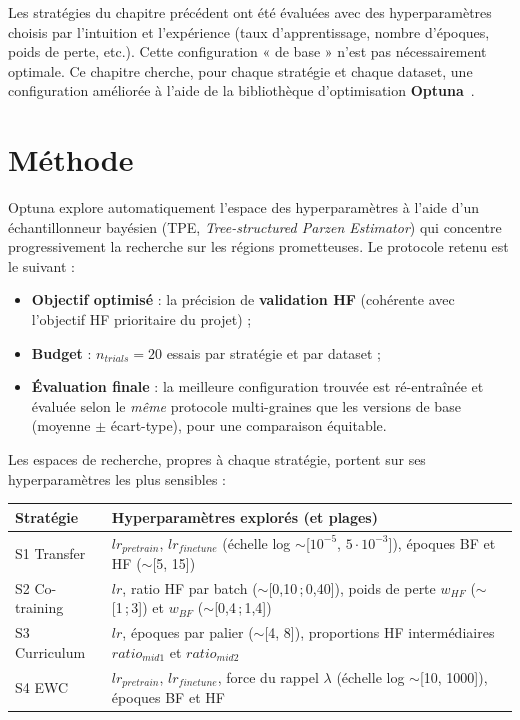 \documentclass[11pt,a4paper,openany]{book}
\newcommand{\tableheadcolor}{\rowcolor{headerbg}}
\newcommand{\tablerowodd}{}
\begin{document}
Les stratégies du chapitre précédent ont été évaluées avec des hyperparamètres choisis par l'intuition et l'expérience (taux d'apprentissage, nombre d'époques, poids de perte, etc.). Cette configuration « de base » n'est pas nécessairement optimale. Ce chapitre cherche, pour chaque stratégie et chaque dataset, une configuration améliorée à l'aide de la bibliothèque d'optimisation \textbf{Optuna}~\cite{akiba2019optuna}.

\section{Méthode}

Optuna explore automatiquement l'espace des hyperparamètres à l'aide d'un échantillonneur bayésien (TPE, \textit{Tree-structured Parzen Estimator}) qui concentre progressivement la recherche sur les régions prometteuses. Le protocole retenu est le suivant :

\begin{itemize}
  \item \textbf{Objectif optimisé} : la précision de \textbf{validation HF} (cohérente avec l'objectif HF prioritaire du projet) ;
  \item \textbf{Budget} : $n_{trials}=20$ essais par stratégie et par dataset ;
  \item \textbf{Évaluation finale} : la meilleure configuration trouvée est ré-entraînée et évaluée selon le \emph{même} protocole multi-graines que les versions de base (moyenne $\pm$ écart-type), pour une comparaison équitable.
\end{itemize}

\vspace{0.4em}
Les espaces de recherche, propres à chaque stratégie, portent sur ses hyperparamètres les plus sensibles :

\vspace{0.6em}
\renewcommand{\arraystretch}{1.4}
\begin{tabularx}{\linewidth}{L{3cm} L{12.5cm}}
  \toprule
  \tableheadcolor
  \textbf{Stratégie} & \textbf{Hyperparamètres explorés (et plages)} \\
  \midrule
  \tablerowodd
  S1 Transfer & $lr_{pretrain}$, $lr_{finetune}$ (échelle log $\sim$[$10^{-5}$, $5\!\cdot\!10^{-3}$]), époques BF et HF ($\sim$[5, 15]) \\
  S2 Co-training & $lr$, ratio HF par batch ($\sim$[0,10\,;\,0,40]), poids de perte $w_{HF}$ ($\sim$[1\,;\,3]) et $w_{BF}$ ($\sim$[0,4\,;\,1,4]) \\
  \tablerowodd
  S3 Curriculum & $lr$, époques par palier ($\sim$[4, 8]), proportions HF intermédiaires $ratio_{mid1}$ et $ratio_{mid2}$ \\
  S4 EWC & $lr_{pretrain}$, $lr_{finetune}$, force du rappel $\lambda$ (échelle log $\sim$[10, 1000]), époques BF et HF \\
  \bottomrule
\end{tabularx}
\end{document}

